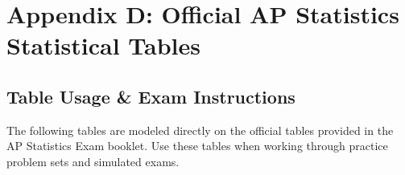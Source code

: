 \chapter{Appendix D: Official AP Statistics Statistical Tables}

\section*{Table Usage \& Exam Instructions}
The following tables are modeled directly on the official tables provided in the AP Statistics Exam booklet. Use these tables when working through practice problem sets and simulated exams.

\clearpage
